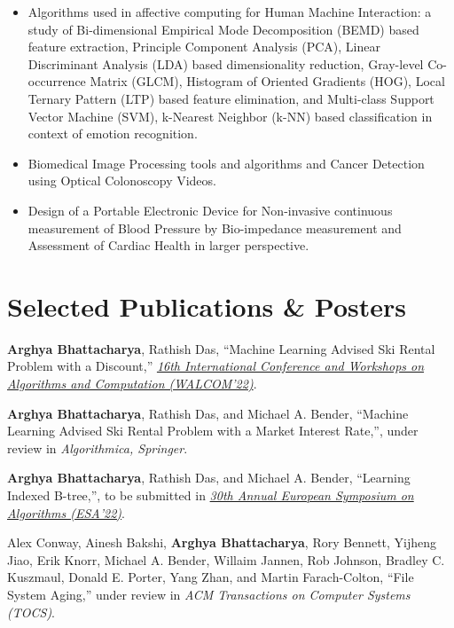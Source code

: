 \documentclass[letterpaper,10pt]{article}
\begin{document}
\begin{itemize}
    \item {Algorithms used in affective computing for Human Machine Interaction: a study of Bi-dimensional Empirical Mode Decomposition (BEMD) based feature extraction, Principle Component Analysis (PCA), Linear Discriminant Analysis (LDA) based dimensionality reduction, Gray-level Co-occurrence Matrix (GLCM), Histogram of Oriented Gradients (HOG), Local Ternary Pattern (LTP) based feature elimination, and Multi-class Support Vector Machine (SVM), k-Nearest Neighbor (k-NN) based classification in context of emotion recognition.}
    \item {Biomedical Image Processing tools and algorithms and Cancer Detection using Optical Colonoscopy Videos.}
    \item {Design of a Portable Electronic Device for Non-invasive continuous measurement of Blood Pressure by Bio-impedance measurement and Assessment of Cardiac Health in larger perspective.}
\end{itemize}
\resumeItemListEnd
\resumeSubHeadingListEnd 


\section{Selected Publications \& Posters}
\label{sec:pubs}
\resumeSubHeadingListStart
\item{\textbf{Arghya Bhattacharya}, Rathish Das, {``Machine Learning Advised Ski Rental Problem with a Discount,''} \href{https://walcom2022.unej.ac.id/instruction-for-author/accepted-papers}{\textit{16th International Conference and Workshops on Algorithms and Computation (WALCOM'22)}}.}

\item{\textbf{Arghya Bhattacharya}, Rathish Das, and Michael A. Bender, {``Machine Learning Advised Ski Rental Problem with a Market Interest Rate,''}, under review in \textit{Algorithmica, Springer}.}

\item{\textbf{Arghya Bhattacharya}, Rathish Das, and Michael A. Bender,  {``Learning Indexed B-tree,''}, to be submitted in \href{https://hpi.de/algo2022/esa/}{\textit{30th Annual European Symposium on Algorithms (ESA'22)}}.}

\item {Alex Conway, Ainesh Bakshi, \textbf{Arghya Bhattacharya}, Rory Bennett, Yijheng Jiao, Erik Knorr, Michael A. Bender, Willaim Jannen, Rob Johnson, Bradley C. Kuszmaul, Donald E. Porter, Yang Zhan, and Martin Farach-Colton, {``File System Aging,''} under review in \textit{ACM Transactions on Computer Systems (TOCS)}.}
\end{document}
